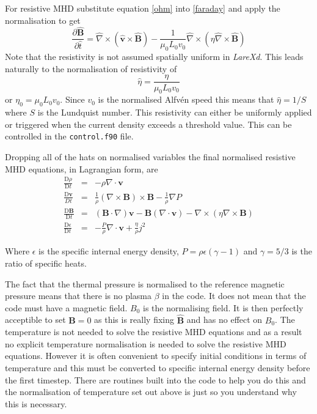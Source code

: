 \documentclass[11pt]{article}
\begin{document}
For resistive MHD substitute equation \ref{ohm} into \ref{faraday} and apply the normalisation to get
\begin{displaymath}
 \frac{\partial \hat{\mathbf{B}}}{\partial \hat{t}}=\hat{\nabla}\times(\hat{\mathbf{v}}\times\hat{\mathbf{B}})
	-\frac{1}{\mu_0 L_0 v_0}\hat{\nabla}\times(\eta\hat{\nabla}\times\hat{\mathbf{B}}) 
\end{displaymath}
Note that the resistivity is not assumed spatially uniform in {\it LareXd}. This leads naturally to the normalisation of resistivity of 
\begin{displaymath}
 \hat{\eta}=\frac{\eta}{\mu_0 L_0 v_0}
\end{displaymath}
or $\eta_0=\mu_0 L_0 v_0$. Since $v_0$ is the normalised Alfv\'en speed this means that $\hat{\eta}=1/S$ where $S$ is the Lundquist number. This resistivity can either be uniformly applied or triggered when the current density exceeds a threshold value. This can be controlled in the \texttt{control.f90} file.

Dropping all of the hats on normalised variables the final normalised resistive MHD equations, in Lagrangian form, are
\begin{eqnarray}
\frac{\mathrm{D}\rho}{\mathrm{D}t}&=&-\rho \nabla\cdot \mathbf{v}\\
\frac{\mathrm{D}\mathbf{v}}{Dt}&=&\frac{1}{\rho}(\nabla\times\mathbf{B})\times\mathbf{B}
-\frac{1}{\rho}\nabla P \label{velocity_eqn}\\
\frac{\mathrm{D}\mathbf{B}}{\mathrm{D}t}&=&(\mathbf{B}\cdot\nabla)\mathbf{v}-\mathbf{B}
(\nabla\cdot\mathbf{v})-\nabla\times(\eta\nabla\times\mathbf{B})\\
\frac{\mathrm{D}\epsilon}{\mathrm{D}t}&=&-\frac{P}{\rho}\nabla\cdot\mathbf{v}+\frac
{\eta}{\rho}j^{2} \label{energy_eqn}
\end{eqnarray}

Where $\epsilon$ is the specific internal energy density, $P = \rho \epsilon(\gamma - 1)$ and $\gamma = 5/3$ is the ratio of specific heats.

The fact that the thermal pressure is normalised to the reference magnetic pressure means that there is no plasma $\beta$ in the code. It does not mean that the code must have a magnetic field. $B_0$ is the normalising field. It is then perfectly acceptible to set $\mathbf{B}=0$ as this is really fixing $\hat{\mathbf{B}}$ and has no effect on  $B_0$. The temperature is not needed to solve the resistive MHD equations and as a result no explicit temperature normalisation is needed to solve the resistive MHD equations. However it is often convenient to specify initial conditions in terms of temperature and this must be converted to specific internal energy density before the first timestep. There are routines built into the code to help you do this and the normalisation of temperature set out above is just so you understand why this is necessary. 
\end{document}
